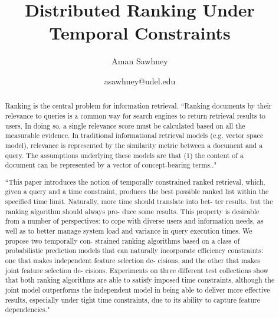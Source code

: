 \documentclass[10pt, conference, compsocconf]{IEEEtran}
\begin{document}
\title{Distributed Ranking Under Temporal Constraints}

\author{Aman Sawhney}
\date{asawhney@udel.edu}



\maketitle


\begin{abstract}
Ranking is the central problem for information retrieval.
``Ranking documents by their relevance to queries is a common way for search engines to return retrieval results to users. 
In doing so, a single relevance score must be calculated based on all the measurable evidence. 
In traditional informational retrieval models (e.g. vector space model), relevance is represented by the similarity metric between a document and a query. The assumptions underlying these models are that (1) the content of a document can be represented by a vector of concept-bearing terms.."

``This paper introduces the notion of temporally constrained ranked retrieval, which, given a query and a time constraint, produces the best possible ranked list within the specified time limit. Naturally, more time should translate into bet- ter results, but the ranking algorithm should always pro- duce some results. This property is desirable from a number of perspectives: to cope with diverse users and information needs, as well as to better manage system load and variance in query execution times. We propose two temporally con- strained ranking algorithms based on a class of probabilistic prediction models that can naturally incorporate efficiency constraints: one that makes independent feature selection de- cisions, and the other that makes joint feature selection de- cisions. Experiments on three different test collections show that both ranking algorithms are able to satisfy imposed time constraints, although the joint model outperforms the independent model in being able to deliver more effective results, especially under tight time constraints, due to its ability to capture feature dependencies."
\end{abstract}
\end{document}
